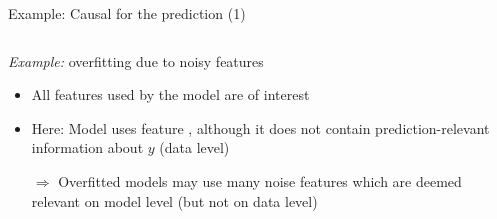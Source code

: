 \documentclass[10pt,compress,t,notes=noshow, xcolor=table]{beamer}
\begin{document}
\begin{frame}{Example: Causal for the prediction (1)}
\begin{columns}[T, totalwidth = \textwidth]
\begin{column}{0.55\linewidth}
  \textit{Example:} overfitting due to noisy features
  \pause
    \begin{itemize}
      \item All features used by the model are of interest
      \item Here: Model uses feature , although it does not contain prediction-relevant information about $y$ (data level)
      \item[$\Rightarrow$] Overfitted models may use many noise features which are deemed relevant on model level (but not on data level)
  \end{itemize}
  \end{column}
\end{columns}

\end{frame}



\end{document}
